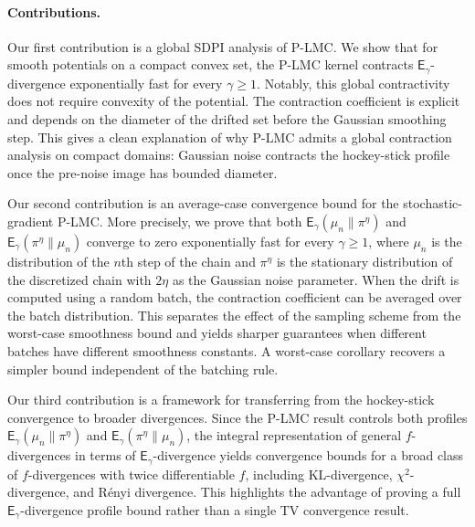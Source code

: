 \documentclass[10pt, journal]{IEEEtran}
\newcommand{\sE}{\mathsf{E}}
\begin{document}
\paragraph{Contributions.}
Our first contribution is a global SDPI analysis of P-LMC. We show that for smooth potentials on a compact convex set, the P-LMC kernel contracts $\mathsf E_\gamma$-divergence exponentially fast for every $\gamma\ge1$. Notably, this global contractivity does not require convexity of the potential. The contraction coefficient is explicit and depends on the diameter of the drifted set before the Gaussian smoothing step. This gives a clean explanation of why P-LMC admits a global contraction analysis on compact domains: Gaussian noise contracts the hockey-stick profile once the pre-noise image has bounded diameter.

Our second contribution is an average-case convergence bound for the stochastic-gradient P-LMC. More precisely, we prove that both $\mathsf E_\gamma(\mu_n\|\pi^\eta)$ and $\mathsf E_\gamma(\pi^\eta\|\mu_n)$ converge to zero exponentially fast for every $\gamma\geq 1$, where  $\mu_n$ is the distribution of the $n$th step of the chain and $\pi^\eta$ is the stationary distribution of the discretized chain with $2\eta$ as the Gaussian noise parameter. When the drift is computed using a random batch, the contraction coefficient can be averaged over the batch distribution. This separates the effect of the sampling scheme from the worst-case smoothness bound and yields sharper guarantees when different batches have different smoothness constants. A worst-case corollary recovers a simpler bound independent of the batching rule.

Our third contribution is a framework for transferring from the hockey-stick convergence to broader divergences. Since the P-LMC result controls both profiles $\mathsf E_\gamma(\mu_n\|\pi^\eta)$ and $\mathsf E_\gamma(\pi^\eta\|\mu_n)$, the integral representation of general $f$-divergences in terms of $\sE_\gamma$-divergence yields convergence bounds for a broad class of $f$-divergences with twice differentiable $f$, including KL-divergence, $\chi^2$-divergence, and R\'enyi divergence. This highlights the advantage of proving a full $\mathsf E_\gamma$-divergence profile bound rather than a single TV convergence result.
\end{document}
